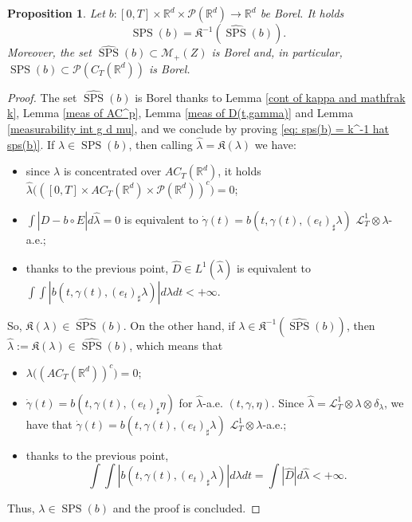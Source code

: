 \documentclass[10pt,leqno]{amsart}
\numberwithin{equation}{section}
\newtheorem{prop}[teorema]{Proposition}
\newcommand{\R}{\mathbb{R}}
\newcommand{\PP}{\mathcal{P}}
\begin{document}
\begin{prop}\label{meas of SPSb}
    Let $b:[0,T]\times \R^d \times \PP(\R^d) \to \R^d$ be Borel. It holds
    \begin{equation}\label{eq: sps(b) = k^-1 hat sps(b)}
        \operatorname{SPS}(b) = \mathfrak{K}^{-1}(\hat{\operatorname{SPS}}(b)).
    \end{equation}
    Moreover, the set $\hat{\operatorname{SPS}}(b)\subset \mathcal{M}_+(Z)$ is Borel and, in particular, $\operatorname{SPS}(b) \subset \PP(C_T(\R^d))$ is Borel.
\end{prop}

\begin{proof}
    The set $\hat{\operatorname{SPS}}(b)$ is Borel thanks to Lemma \ref{cont of kappa and mathfrak k}, Lemma \ref{meas of AC^p}, Lemma \ref{meas of D(t,gamma)} and Lemma \ref{measurability int g d mu}, and we conclude by proving \eqref{eq: sps(b) = k^-1 hat sps(b)}. If $\lambda\in \operatorname{SPS}(b)$, then calling $\hat{\lambda}= \mathfrak{K}(\lambda)$ we have:
    \begin{itemize}
        \item since $\lambda$ is concentrated over $AC_T(\R^d)$, it holds $\hat{\lambda}\big(([0,T]\times AC_T(\R^d)\times \PP(\R^d))^c\big)=0$;
        \item $\int |D-b\circ \hat{E}| d\hat{\lambda}=0$ is equivalent to $\dot{\gamma}(t) = b(t,\gamma(t),(e_t)_\sharp \lambda)$ $\mathcal{L}^1_T\otimes \lambda$-a.e.;
        \item thanks to the previous point, $\hat{D}\in L^1(\hat{\lambda})$ is equivalent to $\int \int |b(t,\gamma(t),(e_t)_\sharp \lambda)|  d\lambda dt <+\infty$.
    \end{itemize}
    So, $\mathfrak{K}(\lambda)\in \hat{\operatorname{SPS}}(b)$.
    On the other hand, if $\lambda \in \mathfrak{K}^{-1}(\hat{\operatorname{SPS}}(b))$, then $\hat{\lambda}:= \mathfrak{K}(\lambda) \in \hat{\operatorname{SPS}}(b)$, which means that 
    \begin{itemize}
        \item $\lambda\big((AC_T(\R^d))^c\big) = 0$;
        \item $\dot\gamma(t) = b(t,\gamma(t),(e_t)_\sharp \eta)$ for $\hat{\lambda}$-a.e. $(t,\gamma,\eta)$. Since $\hat{\lambda} = \mathcal{L}^1_T\otimes\lambda\otimes\delta_{\lambda}$, we have that $\dot\gamma(t) = b(t,\gamma(t),(e_t)_\sharp \lambda)$ $\mathcal{L}^1_T\otimes\lambda$-a.e.;
        \item thanks to the previous point, 
        \[\int\int |b(t,\gamma(t),(e_t)_\sharp \lambda)| d\lambda dt = \int | \hat{D}| d\hat{\lambda}<+\infty.\]
    \end{itemize}
    Thus, $\lambda\in \operatorname{SPS}(b)$ and the proof is concluded.
\end{proof}
\end{document}

